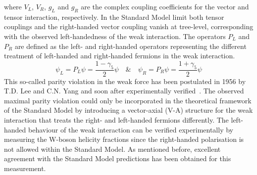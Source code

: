 where $V_L$, $V_R$, $g_L$ and $g_R$ are the complex coupling coefficients for the vector and tensor interaction, respectively.
In the Standard Model limit both tensor couplings and the right-handed vector coupling vanish at tree-level, corresponding with the observed left-handedness of the weak interaction.
The operators $P_L$ and $P_R$ are defined as the left- and right-handed operators representing the different treatment of left-handed and right-handed fermions in the weak interaction.
\begin{equation}
 \psi_L = P_L \psi = \frac{1-\gamma_5}{2} \psi \quad \& \quad \psi_R = P_R \psi = \frac{1+\gamma_5}{2} \psi
\end{equation}
This so-called parity violation in the weak force has been postulated in 1956 by T.D. Lee and C.N. Yang and soon after experimentally verified~\cite{PViolationLeeYang, PViolationWu}. 
The observed maximal parity violation could only be incorporated in the theoretical framework of the Standard Model by introducing a vector-axial (V-A) structure for the weak interaction that treats the right- and left-handed fermions differently.
The left-handed behaviour of the weak interaction can be verified experimentally by measuring the W-boson helicity fractions since the right-handed polarisation is not allowed within the Standard Model.
As mentioned before, excellent agreement with the Standard Model predictions has been obtained for this measurement.

